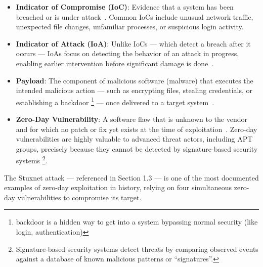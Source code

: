 \begin{itemize}
\begin{itemize}
        \item \textit{Insider Threats}: Employees or contractors who misuse their access, intentionally or accidentally.
        \item \textit{Hacktivists}: Groups motivated by political or ideological goals.
    \end{itemize}
\item \textbf{Indicator of Compromise (IoC)}: Evidence that a system has been breached or is under attack~\cite{crowdstrike2024ioa}. Common IoCs include unusual network traffic, unexpected file changes, unfamiliar processes, or suspicious login activity.
      \item \textbf{Indicator of Attack (IoA)}: Unlike IoCs --- which detect a breach after it occurs --- IoAs focus on detecting the behavior of an attack in progress, enabling earlier intervention before significant damage is done~\cite{crowdstrike2024ioa}.
\end{itemize}


\begin{itemize}
      \item \textbf{Payload}: The component of malicious software (malware) that executes the intended malicious action --- such as encrypting files, stealing credentials, or establishing a backdoor \footnote{backdoor is a hidden way to get into a system bypassing normal security (like login, authentication)} --- once delivered to a target system~\cite{cloudflare2024payload}.
      \item \textbf{Zero-Day Vulnerability}: A software flaw that is unknown to the vendor and for which no patch or fix yet exists at the time of exploitation~\cite{deepinstinct2023zeroday}. Zero-day vulnerabilities are highly valuable to advanced threat actors, including APT groups, precisely because they cannot be detected by signature-based security systems \footnote{Signature-based security systems detect threats by comparing observed events against a database of known malicious patterns or ``signatures''.}.
\end{itemize}

The Stuxnet attack --- referenced in Section 1.3 --- is one of the most documented examples of zero-day exploitation in history, relying on four simultaneous zero-day vulnerabilities to compromise its target.

